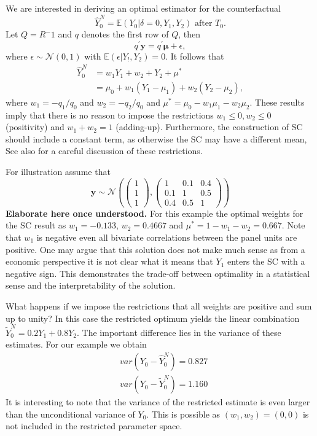 We are interested in deriving an optimal estimator for the counterfactual
\[
\widehat{Y}^{N}_{0} = \mathbb{E}(Y_0 | \delta = 0, Y_1, Y_2) \text{ after } T_0. 
\] 
Let $Q = R^-1$ and $q$ denotes the first row of $Q$, then
\[
q^\prime \boldsymbol{y} = q^\prime \boldsymbol{\mu} + \epsilon,
\] 
where $\epsilon \sim \mathcal{N}(0,1)$ with $\mathbb{E}(\epsilon | Y_!, Y_2) = 0.$ It follows that  
\begin{equation*}
	\begin{split}
		\widehat{Y}^{N}_{0} & = w_1 Y_1 + w_2 + Y_2 + \mu^* \\
		& = \mu_0 + w_1(Y_1 - \mu_1) + w_2(Y_2 - \mu_2),
	\end{split}
\end{equation*}
where $w_1 = -q_1/q_0$ and $w_2 = -q_2/q_0$ and $\mu^* = \mu_0 - w_1\mu_1 -  w_2\mu_2$. These results imply that there is no reason to impose the restrictions $w_1 \leq 0, w_2 \leq 0$ (positivity) and $w_1 + w_2 = 1$ (adding-up). Furthermore, the construction of \ac{SC} should include a constant term, as otherwise the \ac{SC} may have a different mean, See also \cite{doudchenko:2016} for a careful discussion of these restrictions.

For illustration assume that
\[
\boldsymbol{y} \sim \mathcal{N}\left( 
\begin{pmatrix} 1\\ 1\\ 1 \end{pmatrix}, 
\begin{pmatrix} 1 &0.1 &0.4\\0.1 &1 &0.5\\0.4 &0.5 &1 \end{pmatrix}\right) 
\] 
\textbf{Elaborate here once understood.} For this  example the optimal weights for the \ac{SC} result as $w_1 = -0.133$, $w_2 = 0.4667$ and $\mu^* = 1 - w_1 - w_2 = 0.667$. Note that $w_1$ is negative even all bivariate correlations between the panel units are positive. One may argue that this solution does not make much sense as from a economic perspective it is not clear what  it means that $Y_1$ enters the \ac{SC} with a negative sign. This demonstrates the trade-off between optimality in a statistical sense and the interpretability of the solution.

What happens if we impose the restrictions that all weights are positive and sum up to unity? In this case the restricted optimum yields the linear combination $\widetilde{Y}^{N}_{0} = 0.2 Y_1 + 0.8 Y_2$. The important difference lies in the variance of these estimates. For our example we obtain
\begin{equation*}
	\begin{split}
		& var(Y_0 - \widehat{Y}^{N}_{0}) = 0.827 \\
		& var(Y_0 - \widetilde{Y}^{N}_{0}) = 1.160		
	\end{split}
\end{equation*}
It is interesting to note that the variance of the restricted estimate is even larger than the unconditional variance of $Y_0$. This is possible as $(w_1, w_2) = (0,0)$ is not included in the restricted parameter space. 

